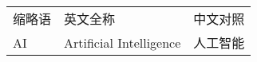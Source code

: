 \begin{center}
    \begin{longtable}{p{2cm}p{6cm}p{4cm}}
        缩略语 & 英文全称 & 中文对照 \\
        AI & Artificial Intelligence & 人工智能
    \end{longtable}
\end{center}

